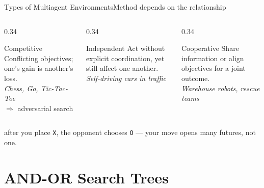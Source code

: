 \documentclass[aspectratio=169,11pt]{beamer}
\begin{document}
\begin{frame}{Types of Multiagent Environments}{Method depends on the relationship}
  \begin{columns}[T]
    \begin{column}{0.34\textwidth}
      \begin{block}{Competitive}
        \small Conflicting objectives; one's gain is another's loss.
        \\[0.3em] \scriptsize \textit{Chess, Go, Tic-Tac-Toe} \\ $\Rightarrow$ adversarial search
      \end{block}
    \end{column}
    \begin{column}{0.34\textwidth}
      \begin{exampleblock}{Independent}
        \small Act without explicit coordination, yet still affect one another.
        \\[0.3em] \scriptsize \textit{Self-driving cars in traffic}
      \end{exampleblock}
    \end{column}
    \begin{column}{0.34\textwidth}
      \begin{block}{Cooperative}
        \small Share information or align objectives for a joint outcome.
        \\[0.3em] \scriptsize \textit{Warehouse robots, rescue teams}
      \end{block}
    \end{column}
  \end{columns}
  \vspace{0.5em}
  \begin{center}\small
     after you place \texttt{X}, the opponent chooses
    \texttt{O} — your move opens many futures, not one.
  \end{center}
\end{frame}

\section{AND-OR Search Trees}
\end{document}
